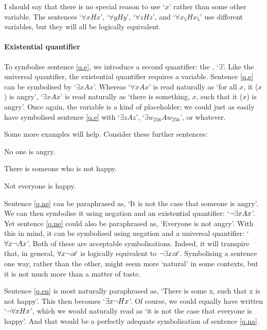 I should say that there is no special reason to use `$x$' rather than some other variable. The sentences `$\forall x Hx$', `$\forall y Hy$', `$\forall z Hz$', and `$\forall x_5 Hx_5$' use different variables, but they will all be logically equivalent.

\paragraph{Existential quantifier} To symbolise sentence \ref{q.e}, we introduce a second quantifier: the , `$\exists$'. Like the universal quantifier, the existential quantifier requires a variable. Sentence \ref{q.e} can be symbolised by `$\exists x Ax$'. Whereas `$\forall x Ax$' is read naturally as `for all $x$, it ($x$) is angry', `$\exists x Ax$' is read naturally as `there is something, $x$, such that it ($x$) is angry'. Once again, the variable is a kind of placeholder; we could just as easily have symbolised sentence \ref{q.e} with `$\exists z Az$', `$\exists w_{256} Aw_{256}$', or whatever.

Some more examples will help. Consider these further sentences:
	\begin{earg}
		\item[\ex{q.ne}] No one is angry.
		\item[\ex{q.en}] There is someone who is not happy.
		\item[\ex{q.na}] Not everyone is happy.
	\end{earg}
Sentence \ref{q.ne} can be paraphrased as, `It is not the case that someone is angry'. We can then symbolise it using negation and an existential quantifier: `$\neg \exists x Ax$'. Yet sentence \ref{q.ne} could also be paraphrased as, `Everyone is not angry'. With this in mind, it can be symbolised using negation and a universal quantifier: `$\forall x \neg Ax$'. Both of these are acceptable symbolisations.  Indeed, it will transpire that, in general, $\forall x \neg\mathscr{A}$ is logically equivalent to $\neg\exists x\mathscr{A}$.  Symbolising a sentence one way, rather than the other, might seem more `natural' in some contexts, but it is not much more than a matter of taste.

Sentence \ref{q.en} is most naturally paraphrased as, `There is some x, such that x is not happy'. This then becomes `$\exists x \neg Hx$'. Of course, we could equally have written `$\neg\forall x Hx$', which we would naturally read as `it is not the case that everyone is happy'. And that would be a perfectly adequate symbolisation of sentence \ref{q.na}.

